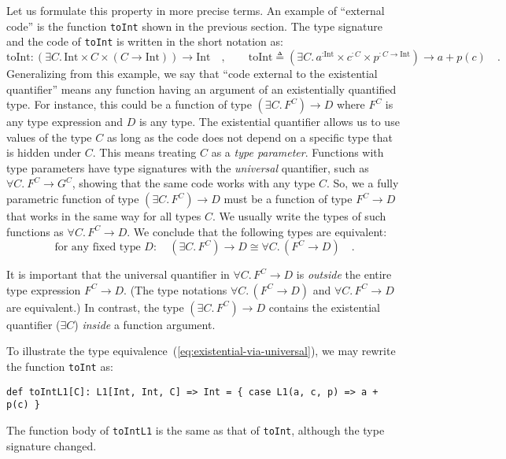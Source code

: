 Let us formulate this property in more precise terms. An example of
\textsf{``}external code\textsf{''} is the function \lstinline!toInt!
shown in the previous section. The type signature and the code of
\lstinline!toInt! is written
in the short notation as:
\[
\text{toInt}:\left(\exists C.\,\text{Int}\times C\times(C\rightarrow\text{Int})\right)\rightarrow\text{Int}\quad,\quad\quad\text{toInt}\triangleq(\exists C.\,a^{:\text{Int}}\times c^{:C}\times p^{:C\rightarrow\text{Int}})\rightarrow a+p(c)\quad.
\]
Generalizing from this example, we say that \textsf{``}code external to the
existential quantifier\textsf{''} means any function having an argument of
an existentially quantified type. For instance, this could be a function
of type $(\exists C.\,F^{C})\rightarrow D$ where $F^{C}$ is any
type expression and $D$ is any type. The existential quantifier allows
us to use values of the type $C$ as long as the code does not depend
on a specific type that is hidden under $C$. This means treating
$C$ as a \emph{type parameter}. Functions with type parameters have
type signatures with the \emph{universal} quantifier, such as $\forall C.\:F^{C}\rightarrow G^{C}$,
showing that the same code works with any type $C$. So, we a fully
parametric function of type $(\exists C.\,F^{C})\rightarrow D$ must
be a function of type $F^{C}\rightarrow D$ that works in the same
way for all types $C$. We usually write the types of such functions
as $\forall C.\,F^{C}\rightarrow D$. We conclude that the following
types are equivalent:
\begin{equation}
\text{for any fixed type }D:\quad(\exists C.\,F^{C})\rightarrow D\cong\forall C.\,(F^{C}\rightarrow D)\quad.\label{eq:existential-via-universal}
\end{equation}

It is important that the universal quantifier in $\forall C.\,F^{C}\rightarrow D$
is \emph{outside} the entire type expression $F^{C}\rightarrow D$.
(The type notations $\forall C.\,(F^{C}\rightarrow D)$ and $\forall C.\,F^{C}\rightarrow D$
are equivalent.) In contrast, the type $(\exists C.\,F^{C})\rightarrow D$
contains the existential quantifier ($\exists C$) \emph{inside} a
function argument.

To illustrate the type equivalence~(\ref{eq:existential-via-universal}),
we may rewrite the function \lstinline!toInt!
as:
\begin{lstlisting}
def toIntL1[C]: L1[Int, Int, C] => Int = { case L1(a, c, p) => a + p(c) }
\end{lstlisting}
The function body of \lstinline!toIntL1!
is the same as that of \lstinline!toInt!,
although the type signature changed.

